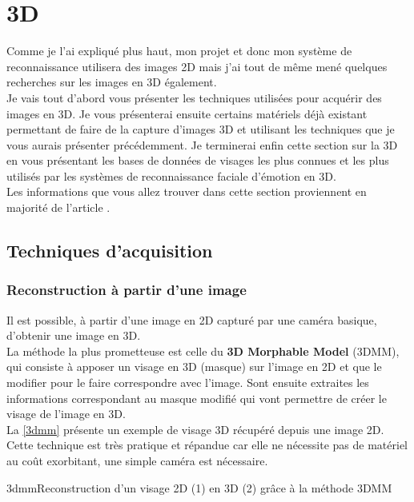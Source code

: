 \documentclass[overfullbox, poster]{polytech/polytech}
\begin{document}
\newpage
\section{3D}
\label{sec:3d}

Comme je l'ai expliqué plus haut, mon projet et donc mon système de reconnaissance utilisera des images 2D mais j'ai tout de même mené quelques recherches sur les images en 3D également.\\
Je vais tout d'abord vous présenter les techniques utilisées pour acquérir des images en 3D. Je vous présenterai ensuite certains matériels déjà existant permettant de faire de la capture d'images 3D et utilisant les techniques que je vous aurais présenter précédemment. Je terminerai enfin cette section sur la 3D en vous présentant les bases de données de visages les plus connues et les plus utilisés par les systèmes de reconnaissance faciale d'émotion en 3D.\\
Les informations que vous allez trouver dans cette section proviennent en majorité de l'article \cite{sota3d}.

\subsection{Techniques d'acquisition}
\label{subsec:tech}

\subsubsection{Reconstruction à partir d'une image}
\label{single_img_reconstruct}
Il est possible, à partir d'une image en 2D capturé par une caméra basique, d'obtenir une image en 3D.\\
La méthode la plus prometteuse est celle du \textbf{3D Morphable Model} (3DMM), qui consiste à apposer un visage en 3D (masque) sur l'image en 2D et que le modifier pour le faire correspondre avec l'image. Sont ensuite extraites les informations correspondant au masque modifié qui vont permettre de créer le visage de l'image en 3D.\\
La \autoref{3dmm} présente un exemple de visage 3D récupéré depuis une image 2D.\\
Cette technique est très pratique et répandue car elle ne nécessite pas de matériel au coût exorbitant, une simple caméra est nécessaire.

\begin{Figure}{3dmm}{Reconstruction d'un visage 2D (1) en 3D (2) grâce à la méthode 3DMM}
\end{Figure}
\end{document}
